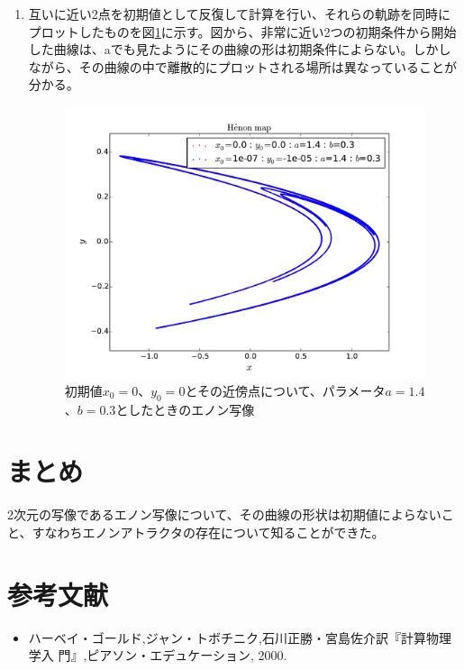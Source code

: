 \documentclass{jsarticle}
\begin{document}
\begin{enumerate}
                \begin{enumerate}
                    \item 互いに近い2点を初期値として反復して計算を行い、それらの軌跡を同時にプロットしたものを図\ref{fig:f3}に示す。図から、非常に近い2つの初期条件から開始した曲線は、aでも見たようにその曲線の形は初期条件によらない。しかしながら、その曲線の中で離散的にプロットされる場所は異なっていることが分かる。
                    \begin{figure}[H]
                        \begin{center}
                        \includegraphics[width=12.5cm]{figure_3.pdf}
                        \caption{初期値$x_{0}=0$、$y_{0}=0$とその近傍点について、パラメータ$a=1.4$、$b=0.3$としたときのエノン写像}
                        \label{fig:f3}
                    \end{center}
                    \end{figure}

                \end{enumerate} 
            
        \end{enumerate}
    
    \section{まとめ}
        2次元の写像であるエノン写像について、その曲線の形状は初期値によらないこと、すなわちエノンアトラクタの存在について知ることができた。
    \section{参考文献}
        \begin{itemize}
            \item ハーベイ・ゴールド,ジャン・トボチニク,石川正勝・宮島佐介訳『計算物理学入
            門』,ピアソン・エデュケーション, 2000.
        \end{itemize}
\end{document}
